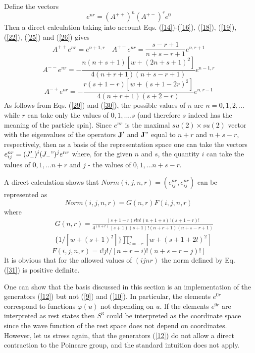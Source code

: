 \documentclass[a4paper,12pt]{article}%
\begin{document}
Define the vectors
\begin{equation}
e^{nr}=(A^{++})^n(A^{+-})^re^0
\label{27}
\end{equation}
Then a direct calculation taking into account Eqs.
(\ref{14})-(\ref{16}), (\ref{18}), (\ref{19}), (\ref{22}), 
(\ref{25}) and (\ref{26}) gives
\begin{equation}
A^{++}e^{nr}=e^{n+1,r}\quad A^{+-}e^{nr}=
\frac{s-r+1}{n+s-r+1}e^{n,r+1}
\label{28}
\end{equation}
\begin{equation}
A^{--}e^{nr}=-\frac{n(n+s+1)[w+(2n+s+1)^2]}
{4(n+r+1)(n+s-r+1)}e^{n-1,r}
\label{29}
\end{equation}
\begin{equation}
A^{-+}e^{nr}=-\frac{r(s+1-r)[w+(s+1-2r)^2]}
{4(n+r+1)(s+2-r)}e^{n,r-1}
\label{30}
\end{equation}
As follows from Eqs. (\ref{29}) and (\ref{30}), 
the possible values of $n$ are $n=0,1,2,...$ while 
$r$ can take only the values of $0,1,....s$
(and therefore $s$ indeed has the meaning of the 
particle spin). 
Since $e^{nr}$ is the maximal $su(2)\times su(2)$ vector with the
eigenvalues of the operators ${\bf J}'$ and ${\bf J}"$ equal to
$n+r$ and $n+s-r$, respectively, then
as a basis of the representation space one can take the vectors
$e_{ij}^{nr}=(J_-')^i (J_-")^je^{nr}$
where, for the given $n$ and $s$, the quantity $i$ can
take the values of $0,1,...n+r$ and $j$ - the values 
of $0,1,...n+s-r$. 

A direct calculation shows that 
$Norm(i,j,n,r)=(e_{ij}^{nr},e_{ij}^{nr})$ can be represented
as
\begin{equation}
Norm(i,j,n,r)=G(n,r)F(i,j,n,r)
\label{31}
\end{equation}
where
\begin{eqnarray}
&&G(n,r)=\frac{(s+1-r)r!n!(n+1+s)!(s+1-r)!}
{4^{(n+r)}(s+1)(s+1)!(n+r+1)(n+s-r+1)}\nonumber\\
&&\{1/[w+(s+1)^2]\}\prod_{l=-r}^{n}[w+(s+1+2l)^2]
\label{32}
\end{eqnarray}
\begin{equation}
F(i,j,n,r)=i!j!/[n+r-i)!(n+s-r-j)!]
\label{33}
\end{equation}
It is obvious that for the allowed values of $(ijnr)$
the norm defined by Eq. (\ref{31}) is positive definite.

One can show that the basis discussed in this section
is an implementation of the generators (\ref{12}) but
not (\ref{9}) and (\ref{10}). In particular, the elements
$e^{0r}$ correspond to functions $\varphi(u)$ not
depending on $u$. If the elements $e^{0r}$ are interpreted
as rest states then $S^3$ could be interpreted as the
coordinate space since the wave function of the rest
space does not depend on coordinates. However, let us
stress again, that the generators (\ref{12}) do not
allow a direct contraction to the Poincare group, and
the standard intuition does not apply.
\end{document}
